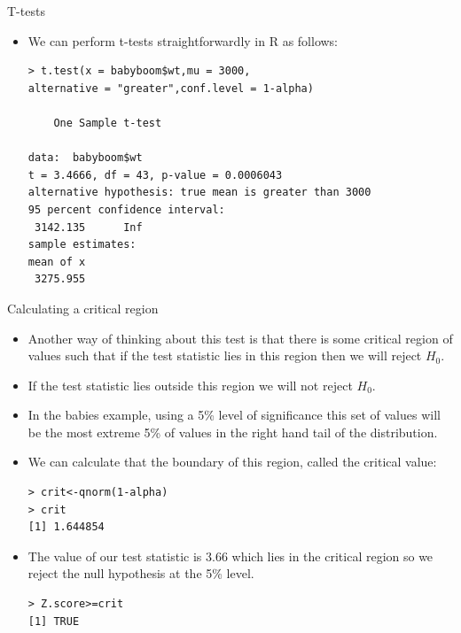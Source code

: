 \documentclass[handout]{beamer}
\begin{document}
\begin{frame}[fragile]{T-tests}
\scriptsize{

 \begin{itemize}
 \item We can perform t-tests straightforwardly in R as follows:
 
 \begin{verbatim}
> t.test(x = babyboom$wt,mu = 3000, 
alternative = "greater",conf.level = 1-alpha)

	One Sample t-test

data:  babyboom$wt
t = 3.4666, df = 43, p-value = 0.0006043
alternative hypothesis: true mean is greater than 3000
95 percent confidence interval:
 3142.135      Inf
sample estimates:
mean of x 
 3275.955 
 \end{verbatim}

 
\end{itemize}


} 
\end{frame}


\begin{frame}[fragile]{Calculating a critical region}
\scriptsize{

 \begin{itemize}
 \item Another way of thinking about this test is that there is some critical region of values such that if the test statistic lies in this region then we will reject $H_0$.
 \item If the test statistic lies outside this region we will not reject $H_0$.
 \item In the babies example, using a 5\% level of significance this set of values will be the most extreme 5\% of values in the right hand tail of the distribution.
 \item We can calculate that the boundary of this region, called the critical value: 
 \begin{verbatim}
> crit<-qnorm(1-alpha)
> crit
[1] 1.644854
 \end{verbatim}

 
 \item The value of our test statistic is 3.66 which lies in the critical region so we reject the null hypothesis at the 5\% level.
  \begin{verbatim}
> Z.score>=crit
[1] TRUE
 \end{verbatim}

 
\end{itemize}


} 
\end{frame}
\end{document}
